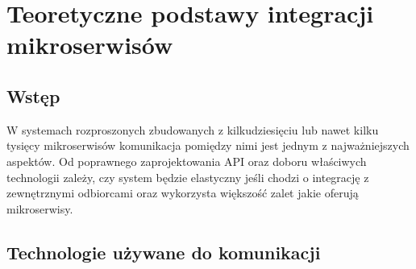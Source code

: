 \chapter{Teoretyczne podstawy integracji mikroserwisów}
\section{Wstęp}
W systemach rozproszonych zbudowanych z kilkudziesięciu lub nawet kilku tysięcy mikroserwisów komunikacja pomiędzy nimi jest jednym z najważniejszych aspektów. Od poprawnego zaprojektowania API oraz doboru właściwych technologii zależy, czy system będzie elastyczny jeśli chodzi o integrację z zewnętrznymi odbiorcami oraz wykorzysta większość zalet jakie oferują mikroserwisy.
\section{Technologie używane do komunikacji}
